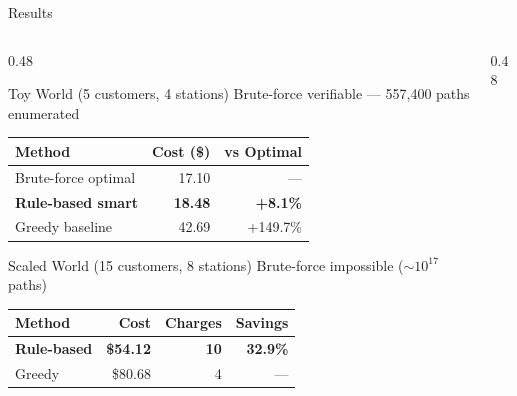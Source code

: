 \documentclass[aspectratio=169, 11pt]{beamer}
\begin{document}
\begin{frame}{Results}

\begin{columns}[T]
\begin{column}{0.48\textwidth}

\begin{block}{Toy World (5 customers, 4 stations)}
Brute-force verifiable --- 557,400 paths enumerated
\end{block}

\vspace{0.3em}
\renewcommand{\arraystretch}{1.25}
\begin{tabular}{@{}l r r@{}}
\toprule
\textbf{Method} & \textbf{Cost (\$)} & \textbf{vs Optimal} \\
\midrule
Brute-force optimal & 17.10 & --- \\
\textcolor{AccentOrange}{\textbf{Rule-based smart}} & \textcolor{AccentOrange}{\textbf{18.48}} & \textcolor{AccentOrange}{\textbf{+8.1\%}} \\
Greedy baseline & 42.69 & +149.7\% \\
\bottomrule
\end{tabular}

\vspace{0.6em}

\begin{block}{Scaled World (15 customers, 8 stations)}
Brute-force impossible ($\sim\!10^{17}$ paths)
\end{block}

\vspace{0.3em}
\renewcommand{\arraystretch}{1.25}
\begin{tabular}{@{}l r r r@{}}
\toprule
\textbf{Method} & \textbf{Cost} & \textbf{Charges} & \textbf{Savings} \\
\midrule
\textcolor{AccentOrange}{\textbf{Rule-based}} & \textcolor{AccentOrange}{\textbf{\$54.12}} & \textcolor{AccentOrange}{\textbf{10}} & \textcolor{AccentOrange}{\textbf{32.9\%}} \\
Greedy & \$80.68 & 4 & --- \\
\bottomrule
\end{tabular}

\end{column}
\begin{column}{0.48\textwidth}

\begin{center}
\end{center}
\end{column}
\end{columns}
\end{frame}
\end{document}
